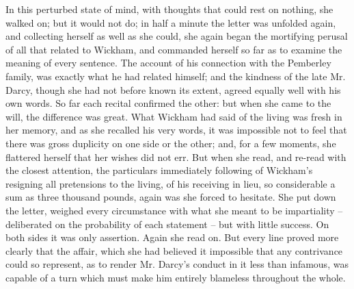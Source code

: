 In this perturbed state of mind, with thoughts that
could rest on nothing, she walked on; but it would not
do; in half a minute the letter was unfolded again, and
collecting herself as well as she could, she again began
the mortifying perusal of all that related to Wickham,
and commanded herself so far as to examine the meaning
of every sentence. The account of his connection with
the Pemberley family, was exactly what he had related
himself; and the kindness of the late Mr. Darcy, though
she had not before known its extent, agreed equally well
with his own words. So far each recital confirmed the
other: but when she came to the will, the difference was
great. What Wickham had said of the living was fresh
in her memory, and as she recalled his very words, it was
impossible not to feel that there was gross duplicity on
one side or the other; and, for a few moments, she flattered
herself that her wishes did not err. But when she read,
and re-read with the closest attention, the particulars
immediately following of Wickham’s resigning all pretensions
to the living, of his receiving in lieu, so considerable
a sum as three thousand pounds, again was she forced
to hesitate. She put down the letter, weighed every
circumstance with what she meant to be impartiality -- deliberated
on the probability of each statement -- but
with little success. On both sides it was only assertion.
Again she read on. But every line proved more clearly
that the affair, which she had believed it impossible that
any contrivance could so represent, as to render Mr. Darcy’s
conduct in it less than infamous, was capable of a turn
which must make him entirely blameless throughout the
whole.

